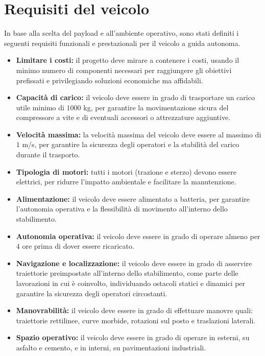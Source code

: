 \section{Requisiti del veicolo}
In base alla scelta del payload e all'ambiente operativo, sono stati definiti i seguenti requisiti funzionali e prestazionali per il veicolo a guida autonoma.
\begin{itemize}
    \item \textbf{Limitare i costi:} il progetto deve mirare a contenere i costi, usando il minimo numero di componenti necessari per raggiungere gli obiettivi prefissati e privilegiando soluzioni economiche ma affidabili.
    \item \textbf{Capacità di carico:} il veicolo deve essere in grado di trasportare un carico utile minimo di $1000$ kg, per garantire la movimentazione sicura del compressore a vite e di eventuali accessori o attrezzature aggiuntive.
    \item \textbf{Velocità massima:} la velocità massima del veicolo deve essere al massimo di $1$ m/s, per garantire la sicurezza degli operatori e la stabilità del carico durante il trasporto.
    \item \textbf{Tipologia di motori:} tutti i motori (trazione e sterzo) devono essere elettrici, per ridurre l'impatto ambientale e facilitare la manutenzione.
    \item \textbf{Alimentazione:} il veicolo deve essere alimentato a batteria, per garantire l'autonomia operativa e la flessibilità di movimento all'interno dello stabilimento.
    \item \textbf{Autonomia operativa:} il veicolo deve essere in grado di operare almeno per $4$ ore prima di dover essere ricaricato.
    \item \textbf{Navigazione e localizzazione:} il veicolo deve essere in grado di asservire traiettorie preimpostate all'interno dello stabilimento, come parte delle lavorazioni in cui è coinvolto, individuando ostacoli statici e dinamici per garantire la sicurezza degli operatori circostanti.
    \item \textbf{Manovrabilità:} il veicolo deve essere in grado di effettuare manovre quali: traiettorie rettilinee, curve morbide, rotazioni sul posto e traslazioni laterali.
    \item \textbf{Spazio operativo:} il veicolo deve essere in grado di operare in esterni, su asfalto e cemento, e in interni, su pavimentazioni industriali.
\end{itemize}

